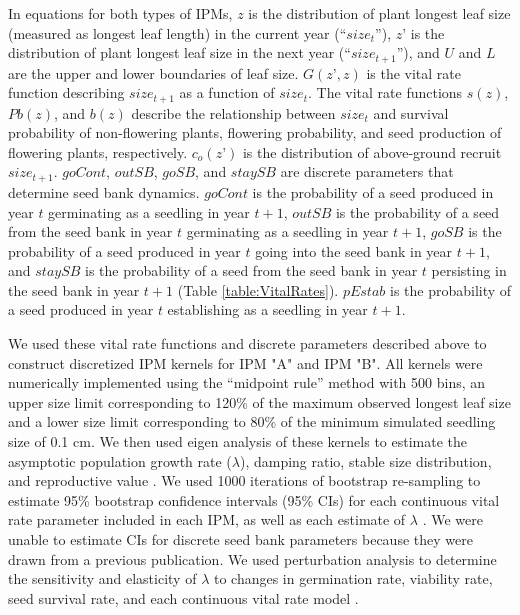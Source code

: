 \documentclass[12pt, letterpaper]{article}
\begin{document}
In equations for both types of IPMs, $z$ is the distribution of plant longest leaf size (measured as longest leaf length) in the current year (“$size_t$”), $z’$ is the distribution of plant longest leaf size in the next year (“$size_{t+1}$”), and $U$ and $L$ are the upper and lower boundaries of leaf size. $G(z’, z)$ is the vital rate function describing $size_{t+1}$ as a function of $size_t$. The vital rate functions $s(z)$, $Pb(z)$, and $b(z)$ describe the relationship between $size_t$ and survival probability of non-flowering plants, flowering probability, and seed production of flowering plants, respectively.  $c_o(z’)$ is the distribution of above-ground recruit $size_{t+1}$. $goCont$, $outSB$, $goSB$, and $staySB$ are discrete parameters that determine seed bank dynamics. $goCont$ is the probability of a seed produced in year $t$ germinating as a seedling in year $t+1$, $outSB$ is the probability of a seed from the seed bank in year $t$ germinating as a seedling in year $t+1$, $goSB$ is the probability of a seed produced in year $t$ going into the seed bank in year $t+1$, and $staySB$ is the probability of a seed from the seed bank in year $t$ persisting in the seed bank in year $t+1$ \cite{Paniw2017} (Table \ref{table:VitalRates}). $pEstab$ is the probability of a seed produced in year $t$ establishing as a seedling in year $t+1$.  

We used these vital rate functions and discrete parameters described above to construct discretized IPM kernels for IPM "A" and IPM "B". All kernels were numerically implemented using the “midpoint rule” method \cite{Easterling2000} with 500 bins, an upper size limit corresponding to 120\% of the maximum observed longest leaf size and a lower size limit corresponding to 80\% of the minimum simulated seedling size of 0.1 cm. We then used eigen analysis of these kernels to estimate the asymptotic population growth rate ($\lambda$), damping ratio, stable size distribution, and reproductive value \cite{Caswell2001MatrixInterpretation, Ellner2016Data-drivenPopulations}. We used 1000 iterations of bootstrap re-sampling to estimate 95\% bootstrap confidence intervals (95\% CIs) for each continuous vital rate parameter included in each IPM, as well as each estimate of $\lambda$ \cite{Merow2014AdvancingGuide, Fieberg2020Resampling-basedBiologists}. We were unable to estimate CIs for discrete seed bank parameters because they were drawn from a previous publication. We used perturbation analysis to determine the sensitivity and elasticity of $\lambda$ to changes in germination rate, viability rate, seed survival rate, and each continuous vital rate model \cite{Morris2002QuantitativeAnalysis}.
\end{document}
